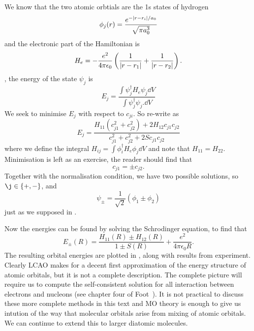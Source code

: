 We know that the two atomic orbtials are the 1s states of hydrogen
%
\begin{equation}
  \phi_j(r) = \frac{e^{-\abs{r - r_i}/a_0}}{\sqrt{\pi a_0^3}}
\end{equation}
%
and the electronic part of the Hamiltonian is 
%
\begin{equation}
  H_e = - \frac{e^2}{4\pi\epsilon_0}\left(\frac{1}{\abs{r-r_1}} +
  \frac{1}{\abs{r-r_2}}\right).
\end{equation}
, the energy of the state $\psi_j$ is
%
\begin{equation}
  E_j = \frac{\int \psi_j^\dagger H_e \psi_j \dd V}{\int \psi_j^\dagger \psi_j.
  \dd V}
\end{equation}
%
We seek to minimise $E_j$ with respect to $c_{ji}$. So re-write as
%
\begin{equation}
  E_j = \frac{H_{11}(c_{j1}^2 + c_{j2}^2) + 2H_{12}c_{j1}c_{j2}}{c_{j1}^2
  + c_{j2}^2 + 2Sc_{j1}c_{j2}}
\end{equation}
%
where we define the integral $H_{ij} = \int \phi_i^\dagger H_e \phi_j \dd V$ and
note that $H_{11} = H_{22}$. Minimisation is left as an exercise, the reader
should find that
%
\begin{equation}
  c_{j1} = \pm c_{j2}.
\end{equation}
%
Together with the normalisation condition, we have two possible solutions, so
$\j \in \{ +, - \}$, and
%
\begin{equation}
  \psi_\pm = \frac{1}{\sqrt{2}}(\phi_1 \pm \phi_2)
\end{equation}
%
just as we supposed in .

Now the energies can be found by solving the Schrodinger equation, to find that
%
\begin{equation}
  E_\pm(R) = \frac{H_{11}(R) \pm H_{12}(R)}{1 \pm S(R)} + \frac{e^2}{4 \pi
  \epsilon_0 R}.
\end{equation}
%
The resulting orbital energies are plotted in ,
along with results from experiment. Clearly LCAO makes for a decent first
approximation of the energy structure of atomic orbitals, but it is not a
complete description. The complete picture will require us to compute the
self-consistent solution for all interaction between electrons and nucleons (see
chapter four of Foot~\cite{Foot2005}). It is not practical to discuss these more
complete methods in this text and MO theory is enough to give us intution of the
way that molecular orbitals arise from mixing of atomic orbitals. We can
continue to extend this to larger diatomic molecules.

